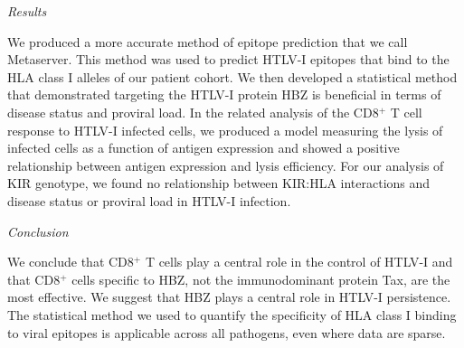 \documentclass[a4paper, 11pt, oneside]{Thesis}	%
\begin{document}
{\emph{Results}

We produced a more accurate method of epitope prediction that we call Metaserver. This method was used to predict HTLV-I epitopes that bind to the HLA class I alleles of our patient cohort. We then developed a statistical method that demonstrated targeting the HTLV-I protein HBZ is beneficial in terms of disease status and proviral load. In the related analysis of the CD8$^+$ T cell response to HTLV-I infected cells, we produced a model measuring the lysis of infected cells as a function of antigen expression and showed a positive relationship between antigen expression and lysis efficiency. For our analysis of KIR genotype, we found no relationship between KIR:HLA interactions and disease status or proviral load in HTLV-I infection.


\emph{Conclusion}

We conclude that CD8$^+$ T cells play a central role in the control of HTLV-I and that CD8$^+$ cells specific to HBZ, not the immunodominant protein Tax, are the most effective. We suggest that HBZ plays a central role in HTLV-I persistence. The statistical method we used to quantify the specificity of HLA class I binding to viral epitopes is applicable across all pathogens, even where data are sparse.

 
}
\end{document}
